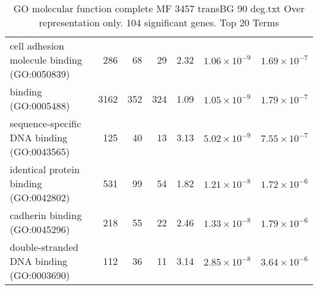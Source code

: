 \begin{table}[ht]
\begin{adjustbox}{width=\textwidth}
\begin{tabular}{lrrrlrr}
  cell adhesion molecule binding (GO:0050839) & 286 & 68 & 29 & 2.32 & $1.06 \times 10^{-9}$ & $1.69 \times 10^{-7}$ \\ 
  binding (GO:0005488) & 3162 & 352 & 324 & 1.09 & $1.05 \times 10^{-9}$ & $1.79 \times 10^{-7}$ \\ 
  sequence-specific DNA binding (GO:0043565) & 125 & 40 & 13 & 3.13 & $5.02 \times 10^{-9}$ & $7.55 \times 10^{-7}$ \\ 
  identical protein binding (GO:0042802) & 531 & 99 & 54 & 1.82 & $1.21 \times 10^{-8}$ & $1.72 \times 10^{-6}$ \\ 
  cadherin binding (GO:0045296) & 218 & 55 & 22 & 2.46 & $1.33 \times 10^{-8}$ & $1.79 \times 10^{-6}$ \\ 
  double-stranded DNA binding (GO:0003690) & 112 & 36 & 11 & 3.14 & $2.85 \times 10^{-8}$ & $3.64 \times 10^{-6}$ \\ 
   \hline
\end{tabular}
\end{adjustbox}
\caption{GO molecular function complete MF 3457 transBG 90 deg.txt Over representation only. 104 significant genes. Top 20 Terms} 
\label{tab:GO molecular function complete MF 3457 transBG 90 deg.txt Over representation only. 104 significant genes. Top 20 Terms}
\end{table}





